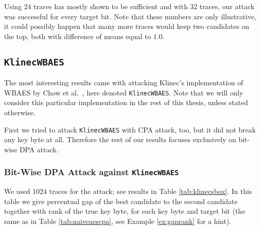 	Using $24$ traces has mostly shown to be sufficient and with $32$ traces, our attack was successful for every target bit. Note that these numbers are only illustrative, it could possibly happen that many more traces would keep two candidates on the top, both with difference of means equal to $1.0$.
	



\subsection{\tt KlinecWBAES}
\label{sec:klinecwbaes}

The most interesting results came with attacking Klinec's implementation \cite{klinec2013implementation} of WBAES by Chow et al.\ \cite{chow2002aes}, here denoted {\tt KlinecWBAES}. Note that we will only consider this particular implementation in the rest of this thesis, unless stated otherwise.

First we tried to attack {\tt KlinecWBAES} with CPA attack, too, but it did not break any key byte at all. Therefore the rest of our results focuses exclusively on bit-wise DPA attack.

\subsubsection{Bit-Wise DPA Attack against {\tt KlinecWBAES}}
	
	We used $1024$ traces for the attack; see results in Table \ref{tab:klinecsbox}. In this table we give percentual gap of the best candidate to the second candidate together with rank of the true key byte, for each key byte and target bit (the same as in Table \ref{tab:naiveaescpa}, see Example \ref{ex:gaprank} for a hint).
	
	
